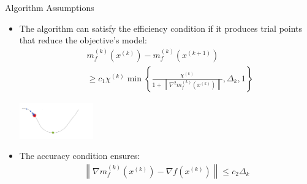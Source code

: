 \documentclass{beamer}
\newcommand{\xk}{{{x}^{(k)}}}
\begin{document}
\begin{frame}{Algorithm Assumptions}
	\setlength\itemsep{2em}
		\begin{itemize}
			\item The algorithm can satisfy the efficiency condition if it produces trial points that reduce the objective's model:
\begin{align*}
	& m_f^{(k)}\left(\xk\right) - m_f^{(k)}\left(x^{(k+1)}\right) \\
	& \ge c_1 \chi^{(k)} \min \left\{
		\frac{\chi^{(k)}}{1 + \left\|\nabla^2 m_f^{(k)}\left(x^{(k)}\right)\right\|},
		\Delta_k, 1\right\}
\end{align*}


\begin{center}
\includegraphics[width=120px]{images/sufficient_reduction.png}
\end{center}

			\item The accuracy condition ensures:
\begin{align*}
		\left\|\nabla m_f^{(k)}\left(x^{(k)}\right) - \nabla f\left(x^{(k)}\right)\right\| \le c_2 \Delta_k
\end{align*}
		

% 		
	\end{itemize}
\end{frame}
\end{document}
